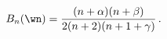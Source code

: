 \begin{equation}
B_n(\wn) =  {(n+\alpha)(n+\beta)\over 2(n+2)(n+1+\gamma)}\,.
\label{bdef}
\end{equation}


